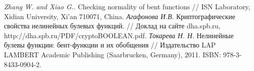 \begin{thebibliography}{99}
 {\it Zhang W. and Xiao G.}. Checking normality of bent functions // ISN Laboratory, Xidian University, Xi’an 710071, China.
 {\it Агафонова И.В.} Криптографические свойства нелинейных булевых функций. // Доклад на сайте dha.spb.ru, http://dha.spb.ru/PDF/cryptoBOOLEAN.pdf.
 {\it Токарева Н. Н.} Нелинейные булевы функции: бент-функции и их обобщения // Издательство LAP LAMBERT Academic Publishing (Saarbrucken, Germany), 2011. ISBN: 978-3-8433-0904-2.









\end{thebibliography}

